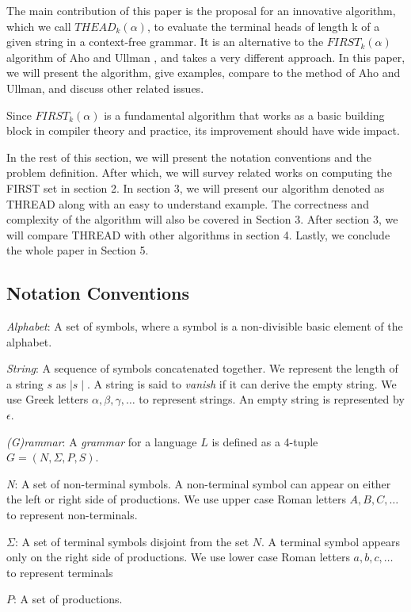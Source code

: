 \documentclass{sig-alternate-05-2015}
\begin{document}
The main contribution of this paper is the proposal for an innovative algorithm, which we call
$THEAD_k(\alpha)$, to evaluate the terminal heads of length k of a
given string in a context-free grammar. It is an alternative
to the $FIRST_k(\alpha)$ algorithm of Aho and Ullman \cite{aho72parsing}, and
takes a very different approach. In this paper, we will present
the algorithm, give examples, compare to the method
of Aho and Ullman, and discuss other related issues.

Since $FIRST_k(\alpha)$ is a fundamental algorithm that works
as a basic building block in compiler theory and practice,
its improvement should have wide impact.

In the rest of this section, we will present the notation conventions and the problem definition. 
After which, we will survey related works on computing the FIRST set in section 2. 
In section 3, we will present our algorithm denoted as THREAD along with an easy to understand example. The correctness and complexity of the algorithm will also be covered in Section 3. 
After section 3, we will compare THREAD with other algorithms in section 4. 
Lastly, we conclude the whole paper in Section 5.


\subsection{Notation Conventions}
\textit{Alphabet}: A set of symbols, where a symbol is a
non-divisible basic element of the alphabet.

\textit{String}: A sequence of symbols concatenated together.
We represent the length of a string $s$ as $\mid s \mid$. A string is said to \textit{vanish} if it can derive the empty
string. We use Greek letters $\alpha, \beta, \gamma, \ldots$ to represent strings. An empty string is represented by $\epsilon$.

\textit{(G)rammar}: A \textit{grammar} for a language $L$ is defined as a 4-tuple $G = (N, \Sigma, P, S)$. 

\textit{N}: A set of non-terminal symbols. A non-terminal symbol can appear on either the
left or right side of productions. We use upper case Roman letters $A, B, C, \ldots$ to represent
non-terminals.

$\Sigma$: A set of terminal symbols disjoint from the set $N$. A terminal symbol appears only on the right side of productions.
We use lower case Roman letters $a, b, c, \ldots$ to represent terminals

$P$: A set of productions.
\end{document}

